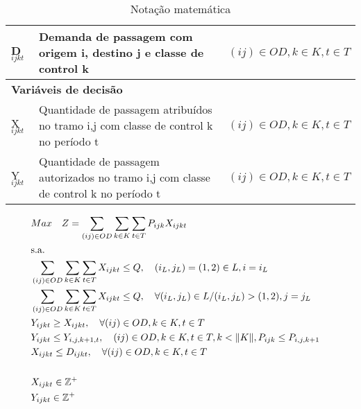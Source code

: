 \documentclass[10pt,a4paper]{article}
\begin{document}
\begin{table}[H]
\begin{tabular}{@{}lll@{}}
		D$_{ijkt}$         & Demanda  de passagem com origem i, destino j e classe de control k                   & $  (ij) \in OD, k \in K, t \in T$ \\ \midrule
		\multicolumn{3}{l}{\textbf{Variáveis de decisão}}                                                                                             \\ \midrule
		X$_{ijkt}$         & Quantidade de passagem atribuídos no tramo i,j com classe de control k no período t  & $(ij) \in OD, k \in K, t \in T$   \\
		Y$_{ijkt}$         & Quantidade de passagem autorizados no tramo i,j com classe de control k no período t & $(ij) \in OD, k \in K, t \in T$   \\ \bottomrule
	\end{tabular}
	\caption{Notação matemática}
	\label{Notacao}
\end{table}

\begin{align}
	 & Max \quad Z = \sum_{(ij)\in OD}\sum_{k\in K} \sum_{t\in T} P_{ijk} X_{ijkt}                                             \label{ecu1}                     & \\
	 & \text{s.a.}  \notag                                                                                                                                                 & \\
	 & \sum_{(ij)\in OD}\sum_{k\in K}\sum_{t\in T}X_{ijkt} \leq Q , \quad (i_L, j_L) = (1,2) \in L, i = i_L                                                \label{ecu2}           & \\
	 & \sum_{(ij)\in OD}\sum_{k\in K}\sum_{t\in T}X_{ijkt} \leq Q , \quad \forall (i_L, j_L) \in L /(i_L, j_L)>(1,2), j = j_L                                              \label{ecu3} & \\
	 & Y_{ijkt} \geq X_{ijkt},  \quad \forall       (ij) \in OD, k \in K, t \in T                                                          \label{ecu4}                    & \\
	 & Y_{ijkt} \leq Y_{i,j,k+1,t},  \quad (ij) \in OD, k \in K, t \in T, k < \lVert K \rVert,  P_{ijk} \leq P_{i,j,k+1}                        \label{ecu5}               & \\
	 & X_{ijkt} \leq D_{ijkt},  \quad \forall (ij) \in OD, k \in K, t \in T                                                                              \label{ecu6}      & \\[15pt]
	 & X_{ijkt} \in \mathbb{Z}^+                                                                                                           \label{ecu10}                   & \\
	 & Y_{ijkt} \in \mathbb{Z}^+                                                                                                           \label{ecu11}
\end{align}
\end{document}
